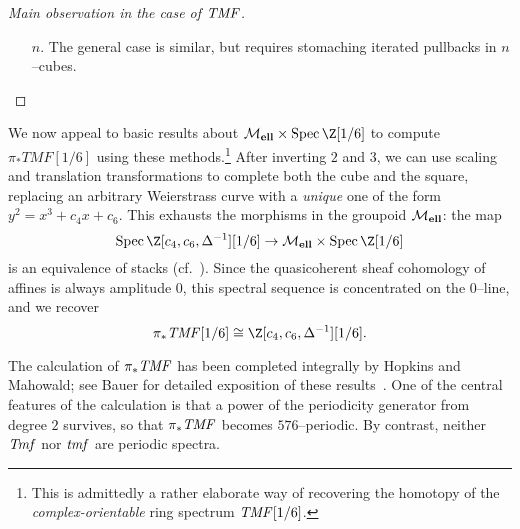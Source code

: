 \begin{proof}[{Main observation in the case of \(\mathit{TMF}\)}]
\begin{enumerate}
\begin{figure}
\begin{center}
    \end{center}
    \caption{Two expressions of the same cubical pullback.}\label{HypercubesFigure}
\end{figure}
    \item[\(n\).] The general case is similar, but requires stomaching iterated pullbacks in \(n\)--cubes. \qedhere
\end{enumerate}
\end{proof}

\begin{example}
We now appeal to basic results about \(\moduli{ell} \times \Spec \Z[1/6]\) to compute \(\pi_* TMF[1/6]\) using these methods.\footnote{This is admittedly a rather elaborate way of recovering the homotopy of the \emph{complex-orientable} ring spectrum \(\mathit{TMF}[1/6]\).}  After inverting \(2\) and \(3\), we can use scaling and translation transformations to complete both the cube and the square, replacing an arbitrary Weierstrass curve with a \emph{unique} one of the form \(y^2 = x^3 + c_4 x + c_6\).  This exhausts the morphisms in the groupoid \(\mathcal{M}_{\mathbf{ell}}\): the map \[\Spec \Z[c_4, c_6, \Delta^{-1}][1/6] \to \moduli{ell} \times \Spec \Z[1/6]\] is an equivalence of stacks (cf.\ ).  Since the quasicoherent sheaf cohomology of affines is always amplitude \(0\), this spectral sequence is concentrated on the \(0\)--line, and we recover \[\pi_* \TMF[1/6] \cong \Z[c_4, c_6, \Delta^{-1}][1/6].\]
\end{example}

\begin{remark}
The calculation of \(\pi_* \mathit{TMF}\) has been completed integrally by Hopkins and Mahowald; see Bauer for detailed exposition of these results~\cite{BauerTMF}.  One of the central features of the calculation is that a power of the periodicity generator from degree \(2\) survives, so that \(\pi_* \mathit{TMF}\) becomes \(576\)--periodic.  By contrast, neither \(\mathit{Tmf}\) nor \(\mathit{tmf}\) are periodic spectra.
\end{remark}










